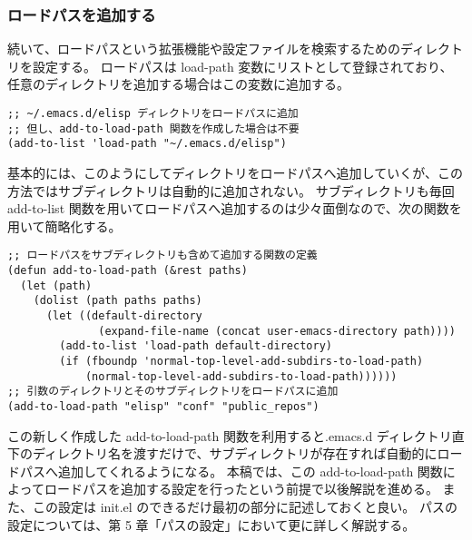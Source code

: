\subsubsection{ロードパスを追加する}
続いて、ロードパスという拡張機能や設定ファイルを検索するためのディレクトリを設定する。
ロードパスは load-path 変数にリストとして登録されており、任意のディレクトリを追加する場合はこの変数に追加する。
\begin{mdframed}[roundcorner=0.50zw,leftmargin=3.00zw,rightmargin=3.00zw,skipabove=0.40zw,skipbelow=0.40zw,innertopmargin=4.00pt,innerbottommargin=4.00pt,innerleftmargin=5.00pt,innerrightmargin=5.00pt,linecolor=gray!020,linewidth=0.50pt,backgroundcolor=gray!20]
\begin{verbatim}
;; ~/.emacs.d/elisp ディレクトリをロードパスに追加
;; 但し、add-to-load-path 関数を作成した場合は不要
(add-to-list 'load-path "~/.emacs.d/elisp")
\end{verbatim}
\end{mdframed}
基本的には、このようにしてディレクトリをロードパスへ追加していくが、この方法ではサブディレクトリは自動的に追加されない。
サブディレクトリも毎回 add-to-list 関数を用いてロードパスへ追加するのは少々面倒なので、次の関数を用いて簡略化する。
\begin{mdframed}[roundcorner=0.50zw,leftmargin=3.00zw,rightmargin=3.00zw,skipabove=0.40zw,skipbelow=0.40zw,innertopmargin=4.00pt,innerbottommargin=4.00pt,innerleftmargin=5.00pt,innerrightmargin=5.00pt,linecolor=gray!020,linewidth=0.50pt,backgroundcolor=gray!20]
\begin{verbatim}
;; ロードパスをサブディレクトリも含めて追加する関数の定義
(defun add-to-load-path (&rest paths)
  (let (path)
    (dolist (path paths paths)
      (let ((default-directory
              (expand-file-name (concat user-emacs-directory path))))
        (add-to-list 'load-path default-directory)
        (if (fboundp 'normal-top-level-add-subdirs-to-load-path)
            (normal-top-level-add-subdirs-to-load-path))))))
;; 引数のディレクトリとそのサブディレクトリをロードパスに追加
(add-to-load-path "elisp" "conf" "public_repos")
\end{verbatim}
\end{mdframed}
この新しく作成した add-to-load-path 関数を利用すると.emacs.d ディレクトリ直下のディレクトリ名を渡すだけで、サブディレクトリが存在すれば自動的にロードパスへ追加してくれるようになる。
本稿では、この add-to-load-path 関数によってロードパスを追加する設定を行ったという前提で以後解説を進める。
また、この設定は init.el のできるだけ最初の部分に記述しておくと良い。
パスの設定については、第 5 章「パスの設定」において更に詳しく解説する。
